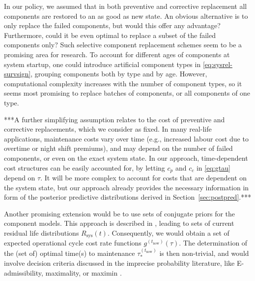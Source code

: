 \documentclass[authoryear]{elsarticle}
\renewcommand{\vec}[1]{{\bm#1}}
\newcommand{\uz}{^{(0)}} %
\newcommand{\Rsys}{R_\text{sys}}
\def\ykz{y\uz_k}
\def\nkz{n\uz_k}
\def\tnow{t_\text{now}}
\newcommand{\Rsysnow}{R^{(t_\text{now})}_\text{sys}}
\def\vectknow{\vec{t}_k^{(\tnow)}}
\newcommand{\gnow}{g^{(\tnow)}}
\newcommand{\tausnow}{\tau_*^{(\tnow)}}
\begin{document}
In our policy, we assumed that in both preventive and corrective replacement
all components are restored to an as good as new state.
An obvious alternative is to only replace the failed components,
but would this offer any advantage?
Furthermore, could it be even optimal to replace a subset of the failed components only?
Such selective component replacement schemes
seem to be a promising area for research.
To account for different ages of components at system startup,
one could introduce artificial component types in \eqref{eq:sysrel-survsign},
grouping components both by type and by age.
However, computational complexity increases with the number of component types,
so it seems most promising to replace batches of components,
or all components of one type.

***A further simplifying assumption relates to the cost of preventive and corrective replacements,
which we consider as fixed.
In many real-life applications, maintenance costs vary over time
(e.g., increased labour cost due to overtime or night shift premiums),
and may depend on the number of failed components, or even on the exact system state.
In our approach, time-dependent cost structures can be easily accounted for,
by letting $c_p$ and $c_c$ in \eqref{eq:gtau} depend on $\tau$.
It will be more complex to account for costs that are dependent on the system state,
but our approach already provides the necessary information
in form of the posterior predictive distributions derived in Section~\ref{sec:postpred}.***

Another promising extension would be to use sets of conjugate priors for the component models.
This approach is described in \cite{2016:walter-coolen},
leading to sets of current residual life distributions $\Rsys(t)$.
Consequently, we would obtain a set of expected operational cycle cost rate functions $\gnow(\tau)$.
The determination of the (set of) optimal time(s) to maintenance $\tausnow$
is then non-trivial,
and would involve decision criteria discussed in the imprecise probability literature,
like E-admissibility, maximality, or maximin \citep[see, e.g., \S 8][]{itip}.
\end{document}
